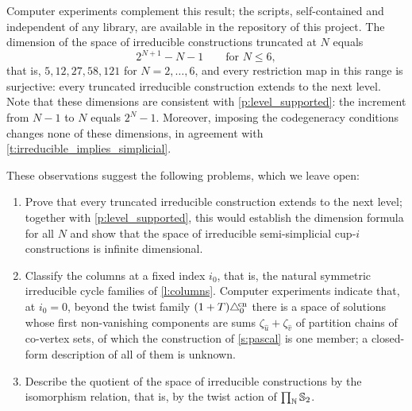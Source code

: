 \documentclass{amsart}
\begin{document}
Computer experiments complement this result; the scripts, self-contained and independent of any library, are available in the repository of this project.
The dimension of the space of irreducible constructions truncated at $N$ equals
\[
2^{N+1} - N - 1
\qquad \text{for } N \leq 6,
\]
that is, $5, 12, 27, 58, 121$ for $N = 2, \dots, 6$, and every restriction map in this range is surjective: every truncated irreducible construction extends to the next level.
Note that these dimensions are consistent with \cref{p:level_supported}: the increment from $N-1$ to $N$ equals $2^N - 1$.
Moreover, imposing the codegeneracy conditions changes none of these dimensions, in agreement with \cref{t:irreducible_implies_simplicial}.

These observations suggest the following problems, which we leave open:
\begin{enumerate}
	\item Prove that every truncated irreducible construction extends to the next level; together with \cref{p:level_supported}, this would establish the dimension formula for all $N$ and show that the space of irreducible semi-simplicial \mbox{cup-$i$} constructions is infinite dimensional.
	\item Classify the columns at a fixed index $i_0$, that is, the natural symmetric irreducible cycle families of \cref{l:columns}.
	Computer experiments indicate that, at $i_0 = 0$, beyond the twist family $(1+T)\triangle^{\!\mathrm{cn}}_0$ there is a space of solutions whose first non-vanishing components are sums $\zeta_{\hat{u}} + \zeta_{\hat{v}}$ of partition chains of co-vertex sets, of which the construction of \cref{s:pascal} is one member; a closed-form description of all of them is unknown.
	\item Describe the quotient of the space of irreducible constructions by the isomorphism relation, that is, by the twist action of $\prod_{\mathbb{N}} \mathbb{S}_2$.
\end{enumerate}

\printbibliography
\end{document}
